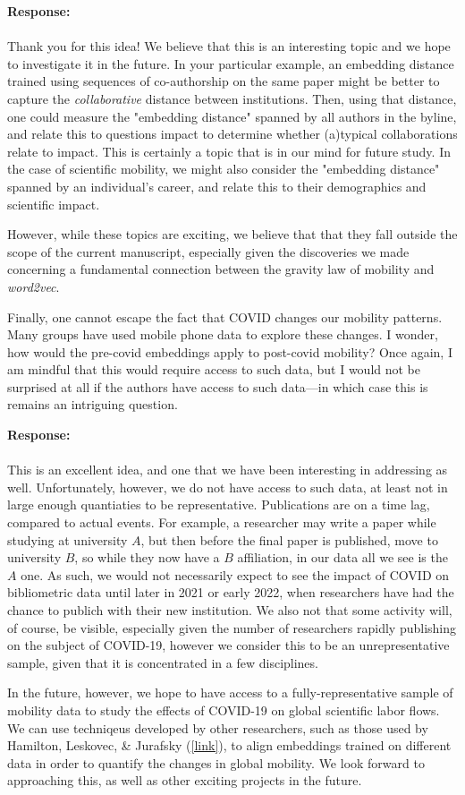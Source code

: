 \documentclass[12pt,a4paper]{article}
\newcommand{\response}[1]{{\noindent \textbf{Response:} \\ \\ \noindent #1}}
\newcommand{\rcomment}[1]{%
\vspace{10pt}
\begin{tcolorbox}[colback=black!3,colframe=white!45!black, left=0pt, right=0pt, top=0pt, bottom=0pt, arc=0pt,outer arc=0pt, grow to left by=-0.5cm,grow to right by=-0.5cm]
#1
\end{tcolorbox}
}
\begin{document}
\response{Thank you for this idea!
We believe that this is an interesting topic and we hope to investigate it in the future. 
In your particular example, an embedding distance trained using sequences of co-authorship on the same paper might be better to capture the \textit{collaborative} distance between institutions. 
Then, using that distance, one could measure the "embedding distance" spanned by all authors in the byline, and relate this to questions impact to determine whether (a)typical collaborations relate to impact. 
This is certainly a topic that is in our mind for future study. 
In the case of scientific mobility, we might also consider the "embedding distance" spanned by an individual's career, and relate this to their demographics and scientific impact. 

However, while these topics are exciting, we believe that that they fall outside the scope of the current manuscript, especially given the discoveries we made concerning a fundamental connection between the gravity law of mobility and \textit{word2vec}.
}


\rcomment{
Finally, one cannot escape the fact that COVID changes our mobility patterns. Many groups have used mobile phone data to explore these changes. I wonder, how would the pre-covid embeddings apply to post-covid mobility? Once again, I am mindful that this would require access to such data, but I would not be surprised at all if the authors have access to such data—in which case this is remains an intriguing question.
}

\response{This is an excellent idea, and one that we have been interesting in addressing as well. 
Unfortunately, however, we do not have access to such data, at least not in large enough quantiaties to be representative. 
Publications are on a time lag, compared to actual events.
For example, a researcher may write a paper while studying at university $A$, but then before the final paper is published, move to university $B$, so while they now have a $B$ affiliation, in our data all we see is the $A$ one. 
As such, we would not necessarily expect to  see the impact of COVID on bibliometric data until later in 2021 or early 2022, when researchers have had the chance to publich with their new institution.
We also not that some activity will, of course, be visible, especially given the number of researchers rapidly publishing on the subject of COVID-19, however we consider this to be an unrepresentative sample, given that it is concentrated in a few disciplines.  

In the future, however, we hope to have access to a fully-representative sample of mobility data to study the effects of COVID-19 on global scientific labor flows. 
We can use techniqeus developed by other researchers, such as those used by Hamilton, Leskovec, \& Jurafsky (\href{https://nlp.stanford.edu/projects/histwords/}{[link]}), to align embeddings trained on different data in order to quantify the changes in global mobility. 
We look forward to approaching this, as well as other exciting projects in the future. 
}
\end{document}
